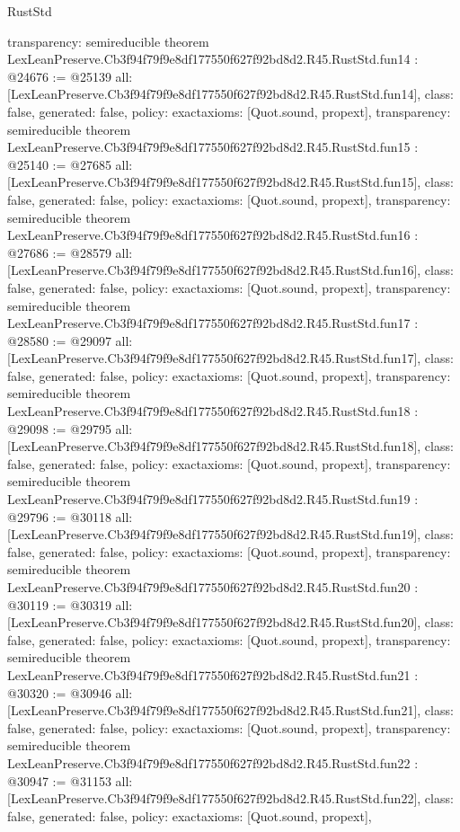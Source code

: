 \begin{lexlean}{RustStd}
\begin{coremodule}
{  transparency: semireducible
}
theorem LexLeanPreserve.Cb3f94f79f9e8df177550f627f92bd8d2.R45.RustStd.fun14 : @24676 := @25139 {
  all: [LexLeanPreserve.Cb3f94f79f9e8df177550f627f92bd8d2.R45.RustStd.fun14],
  class: false,
  generated: false,
  policy: exact{axioms: [Quot.sound, propext]},
  transparency: semireducible
}
theorem LexLeanPreserve.Cb3f94f79f9e8df177550f627f92bd8d2.R45.RustStd.fun15 : @25140 := @27685 {
  all: [LexLeanPreserve.Cb3f94f79f9e8df177550f627f92bd8d2.R45.RustStd.fun15],
  class: false,
  generated: false,
  policy: exact{axioms: [Quot.sound, propext]},
  transparency: semireducible
}
theorem LexLeanPreserve.Cb3f94f79f9e8df177550f627f92bd8d2.R45.RustStd.fun16 : @27686 := @28579 {
  all: [LexLeanPreserve.Cb3f94f79f9e8df177550f627f92bd8d2.R45.RustStd.fun16],
  class: false,
  generated: false,
  policy: exact{axioms: [Quot.sound, propext]},
  transparency: semireducible
}
theorem LexLeanPreserve.Cb3f94f79f9e8df177550f627f92bd8d2.R45.RustStd.fun17 : @28580 := @29097 {
  all: [LexLeanPreserve.Cb3f94f79f9e8df177550f627f92bd8d2.R45.RustStd.fun17],
  class: false,
  generated: false,
  policy: exact{axioms: [Quot.sound, propext]},
  transparency: semireducible
}
theorem LexLeanPreserve.Cb3f94f79f9e8df177550f627f92bd8d2.R45.RustStd.fun18 : @29098 := @29795 {
  all: [LexLeanPreserve.Cb3f94f79f9e8df177550f627f92bd8d2.R45.RustStd.fun18],
  class: false,
  generated: false,
  policy: exact{axioms: [Quot.sound, propext]},
  transparency: semireducible
}
theorem LexLeanPreserve.Cb3f94f79f9e8df177550f627f92bd8d2.R45.RustStd.fun19 : @29796 := @30118 {
  all: [LexLeanPreserve.Cb3f94f79f9e8df177550f627f92bd8d2.R45.RustStd.fun19],
  class: false,
  generated: false,
  policy: exact{axioms: [Quot.sound, propext]},
  transparency: semireducible
}
theorem LexLeanPreserve.Cb3f94f79f9e8df177550f627f92bd8d2.R45.RustStd.fun20 : @30119 := @30319 {
  all: [LexLeanPreserve.Cb3f94f79f9e8df177550f627f92bd8d2.R45.RustStd.fun20],
  class: false,
  generated: false,
  policy: exact{axioms: [Quot.sound, propext]},
  transparency: semireducible
}
theorem LexLeanPreserve.Cb3f94f79f9e8df177550f627f92bd8d2.R45.RustStd.fun21 : @30320 := @30946 {
  all: [LexLeanPreserve.Cb3f94f79f9e8df177550f627f92bd8d2.R45.RustStd.fun21],
  class: false,
  generated: false,
  policy: exact{axioms: [Quot.sound, propext]},
  transparency: semireducible
}
theorem LexLeanPreserve.Cb3f94f79f9e8df177550f627f92bd8d2.R45.RustStd.fun22 : @30947 := @31153 {
  all: [LexLeanPreserve.Cb3f94f79f9e8df177550f627f92bd8d2.R45.RustStd.fun22],
  class: false,
  generated: false,
  policy: exact{axioms: [Quot.sound, propext]},
}
\end{coremodule}
\end{lexlean}
